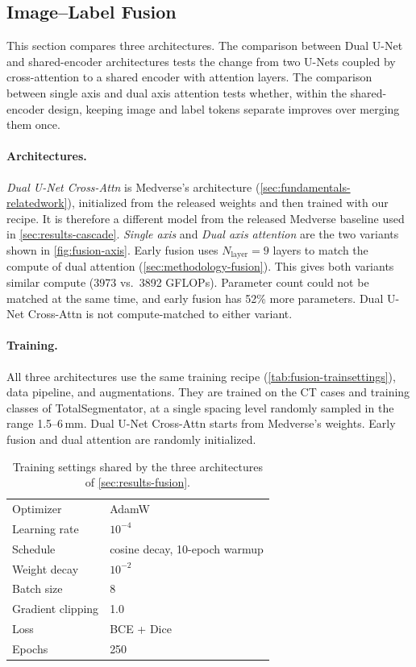 \subsection{Image--Label Fusion}\label{sec:results-fusion}

This section compares three architectures. The comparison between Dual U-Net
 and shared-encoder architectures tests the change from two U-Nets coupled by
cross-attention to a shared encoder with attention layers. The comparison
between single axis and dual axis attention tests whether, within the
shared-encoder design, keeping image and label tokens separate improves over
merging them once.

\paragraph{Architectures.}
\emph{Dual U-Net Cross-Attn} is Medverse's architecture
(\autoref{sec:fundamentals-relatedwork}), initialized from the released weights
and then trained with our recipe. It is therefore a different model from the
released Medverse baseline used in \autoref{sec:results-cascade}.
\emph{Single axis} and \emph{Dual axis attention} are the two variants shown in
\autoref{fig:fusion-axis}. Early fusion uses $N_\text{layer}{=}9$ layers to match the compute of dual attention (\autoref{sec:methodology-fusion}).
This gives both variants similar compute (3973 vs.\ 3892 GFLOPs). Parameter
count could not be matched at the same time, and early fusion has 52\% more
parameters. Dual U-Net Cross-Attn is not compute-matched to either variant.

\paragraph{Training.}
All three architectures use the same training recipe
(\autoref{tab:fusion-trainsettings}), data pipeline, and augmentations. They
are trained on the CT cases and training classes of TotalSegmentator, at a single spacing level randomly sampled in the range 1.5--6\,mm. 
Dual U-Net
Cross-Attn starts from Medverse's weights. Early fusion and dual attention
are randomly initialized.

\begin{table}[t]
  \centering
  \small
  \caption{Training settings shared by the three architectures of
  \autoref{sec:results-fusion}.}
  \label{tab:fusion-trainsettings}
  \begin{tabular}{@{}ll@{}}
    \toprule
    Optimizer & AdamW \\
    Learning rate & $10^{-4}$ \\
    Schedule & cosine decay, 10-epoch warmup \\
    Weight decay & $10^{-2}$ \\
    Batch size & 8 \\
    Gradient clipping & 1.0 \\
    Loss & BCE + Dice \\
    Epochs & 250 \\
    \bottomrule
  \end{tabular}
\end{table}

